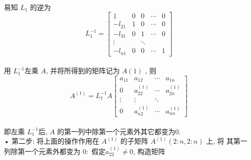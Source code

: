 \documentclass[12pt,a4paper]{article}
\begin{document}
\\
易知 $L_1$ 的逆为
$$
L_{1}^{-1}=\left[\begin{array}{ccccc}{1} & {0} & {0} & {\cdots} & {0} \\ {-l_{21}} & {1} & {0} & {\cdots} & {0} \\ {-l_{31}} & {0} & {1} & {\cdots} & {0} \\ {\vdots} & {} & {\ddots} & {} \\ {-l_{n 1}} & {0} & {0} & {\cdots} & {1}\end{array}\right]
$$
\\
用 $L^{−1}_1 $左乘 $A$, 并将所得到的矩阵记为 $A(1)$
, 则
$$
A^{(1)}=L_{1}^{-1} A\left[\begin{array}{cccc}{a_{11}} & {a_{12}} & {\cdots} & {a_{1 n}} \\ {0} & {a_{22}^{(1)}} & {\cdots} & {a_{2 n}^{(1)}} \\ {\vdots} & {\vdots} & {\ddots} & {} \\ {0} & {a_{n 2}^{(1)}} & {\cdots} & {a_{n n}^{(1)}}\end{array}\right]
$$
\\
即左乘 $L^{−1}_1 $后, $A$ 的第一列中除第一个元素外其它都变为$ 0$.
\\
• 第二步: 将上面的操作作用在 $A^{(1)}$ 的子矩阵 $A^{(1)}(2 : n, 2 : n)$ 上, 将
其第一列除第一个元素外都变为 $0:$ 假定$ a^{(1)}_{22} \neq 0$, 构造矩阵

\end{document}
